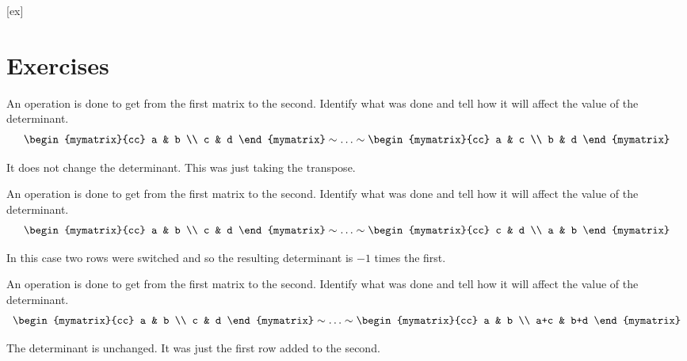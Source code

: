 [ex]
\section*{Exercises}

\begin{enumialphparenastyle}

\begin{ex} An operation is done to get from the first matrix to the second.
Identify what was done and tell how it will affect the value of the
determinant. 
\begin{equation*}
\begin{mymatrix}{cc}
a & b \\
c & d
\end{mymatrix}  \sim \ldots \sim \begin{mymatrix}{cc}
a & c \\
b & d
\end{mymatrix}
\end{equation*}
\begin{sol}
It does not change the determinant. This was just taking the transpose.
\end{sol}
\end{ex}

\begin{ex} An operation is done to get from the first matrix to the second.
Identify what was done and tell how it will affect the value of the
determinant. 
\begin{equation*}
\begin{mymatrix}{cc}
a & b \\
c & d
\end{mymatrix} \sim \ldots \sim \begin{mymatrix}{cc}
c & d \\
a & b
\end{mymatrix}
\end{equation*}
\begin{sol}
In this case two rows were switched and so the resulting determinant is $-1$
times the first.
\end{sol}
\end{ex}


\begin{ex} An operation is done to get from the first matrix to the second.
Identify what was done and tell how it will affect the value of the
determinant. 
\begin{equation*}
\begin{mymatrix}{cc}
a & b \\
c & d
\end{mymatrix} \sim \ldots \sim \begin{mymatrix}{cc}
a & b \\
a+c & b+d
\end{mymatrix}
\end{equation*}
\begin{sol}
The determinant is unchanged. It was just the first row added to the second.
\end{sol}
\end{ex}



\end{enumialphparenastyle}
